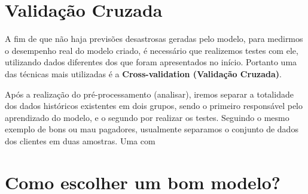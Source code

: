 \documentclass[
]{book}
\begin{document}
\hypertarget{validauxe7uxe3o-cruzada}{%
\section{Validação Cruzada}\label{validauxe7uxe3o-cruzada}}

A fim de que não haja previsões desastrosas geradas pelo modelo, para medirmos o desempenho real do modelo criado, é necessário que realizemos testes com ele, utilizando dados diferentes dos que foram apresentados no início. Portanto uma das técnicas mais utilizadas é a \textbf{Cross-validation (Validação Cruzada)}.

Após a realização do pré-processamento (analisar), iremos separar a totalidade dos dados históricos existentes em dois grupos, sendo o primeiro responsável pelo aprendizado do modelo, e o segundo por realizar os testes.
Seguindo o mesmo exemplo de bons ou mau pagadores, usualmente separamos o conjunto de dados dos clientes em duas amostras. Uma com

\hypertarget{como-escolher-um-bom-modelo}{%
\section{Como escolher um bom modelo?}\label{como-escolher-um-bom-modelo}}

  
\end{document}
